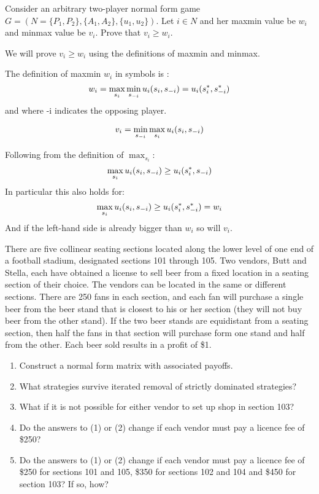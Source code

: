 \documentclass[../main.tex]{subfiles}
\begin{document}
\begin{question}
	Consider an arbitrary two-player normal form game $G = (N=\{P_1,P_2\},\{A_1,A_2\},\{u_1,u_2\})$.
	Let $i \in N$ and her maxmin value be $w_i$ and minmax value be $v_i$. Prove that $v_i \geq w_i$.
\end{question}

\begin{solution}
	We will prove $v_i \geq w_i$ using the definitions of maxmin and minmax.

	\noindent The definition of maxmin $w_i$ in symbols is :
	\begin{equation}
		w_i = \max_{s_i} \min_{s_{\--i}} u_i(s_i,s_{\--i}) = u_i(s_{i}^{*},s_{-i}^{*})
	\end{equation}
	\noindent and where \--i indicates the opposing player. 

	$$v_i = \min_{s_{\--i}} \max_{s_i} u_i(s_i,s_{\--i})$$

	\noindent Following from the definition of $\max_{s_i}$:
	$$\max_{s_i} u_i(s_i,s_{\--i}) \geq u_i(s_i^{*}, s_{\--i})$$
	\noindent In particular this also holds for:
	$$\max_{s_i} u_i(s_i,s_{\--i}) \geq u_i(s_i^{*},s_{\--i}^{*}) = w_i$$
	\noindent And if the left-hand side is already bigger than $w_i$ so will $v_i$.
\end{solution}

\begin{question}

There are five collinear seating sections located along the lower level of one end of a football stadium, designated sections 101 through 105. Two vendors, Butt and Stella, each have obtained a license to sell beer from a fixed location in a seating section of their choice. The vendors can be located in the same or different sections. There are 250 fans in each section, and each fan will purchase a single beer from the beer stand that is closest to his or her section (they will not buy beer from the other stand). If the two beer stands are
equidistant from a seating section, then half the fans in that section will purchase form one stand and half from the other. Each beer sold results in a profit of \$1.

	\begin{enumerate}
		\item Construct a normal form matrix with associated payoffs.
		\item What strategies survive iterated removal of strictly dominated strategies?
		\item What if it is not possible for either vendor to set up shop in section 103?
		\item Do the answers to (1) or (2) change if each vendor must pay a licence fee of \$250?
		\item Do the answers to (1) or (2) change if each vendor must pay a licence fee of \$250 for sections 101 and 105, \$350 for sections 102 and 104 and \$450 for section 103? If so, how?
	\end{enumerate}

\end{question}
\end{document}
